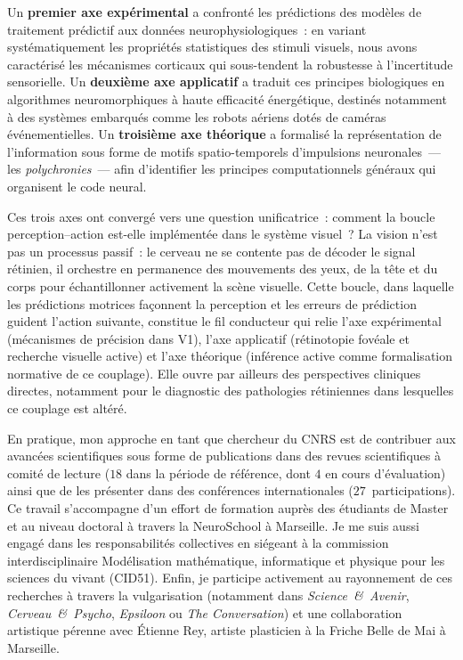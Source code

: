 \documentclass[10pt,french,a4paper]{article}%
\begin{document}
Un \textbf{premier axe expérimental} a confronté les prédictions des modèles de traitement prédictif aux données neurophysiologiques~: en variant systématiquement les propriétés statistiques des stimuli visuels, nous avons caractérisé les mécanismes corticaux qui sous-tendent la robustesse à l'incertitude sensorielle. Un \textbf{deuxième axe applicatif} a traduit ces principes biologiques en algorithmes neuromorphiques à haute efficacité énergétique, destinés notamment à des systèmes embarqués comme les robots aériens dotés de caméras événementielles. Un \textbf{troisième axe théorique} a formalisé la représentation de l'information sous forme de motifs spatio-temporels d'impulsions neuronales~--- les \emph{polychronies}~--- afin d'identifier les principes computationnels généraux qui organisent le code neural.

Ces trois axes ont convergé vers une question unificatrice~: comment la boucle perception--action est-elle implémentée dans le système visuel~? La vision n'est pas un processus passif~: le cerveau ne se contente pas de décoder le signal rétinien, il orchestre en permanence des mouvements des yeux, de la tête et du corps pour échantillonner activement la scène visuelle. Cette boucle, dans laquelle les prédictions motrices façonnent la perception et les erreurs de prédiction guident l'action suivante, constitue le fil conducteur qui relie l'axe expérimental (mécanismes de précision dans V1), l'axe applicatif (rétinotopie fovéale et recherche visuelle active) et l'axe théorique (inférence active comme formalisation normative de ce couplage). Elle ouvre par ailleurs des perspectives cliniques directes, notamment pour le diagnostic des pathologies rétiniennes dans lesquelles ce couplage est altéré.

En pratique, mon approche en tant que chercheur du CNRS est de contribuer aux avancées scientifiques sous forme de publications dans des revues scientifiques à comité de lecture ($18$ dans la période de référence, dont $4$ en cours d'évaluation) ainsi que de les présenter dans des conférences internationales ($27$~participations). Ce travail s'accompagne d'un effort de formation auprès des étudiants de Master et au niveau doctoral à travers la \og{}NeuroSchool\fg{} à Marseille. Je me suis aussi engagé dans les responsabilités collectives en siégeant à la commission interdisciplinaire \og{}Modélisation mathématique, informatique et physique pour les sciences du vivant\fg{} (CID51). Enfin, je participe activement au rayonnement de ces recherches à travers la vulgarisation (notamment dans \emph{Science~\&~Avenir}, \emph{Cerveau~\&~Psycho}, \emph{Epsiloon} ou \emph{The Conversation}) et une collaboration artistique pérenne avec Étienne Rey, artiste plasticien à la Friche Belle de Mai à Marseille.
\end{document}
